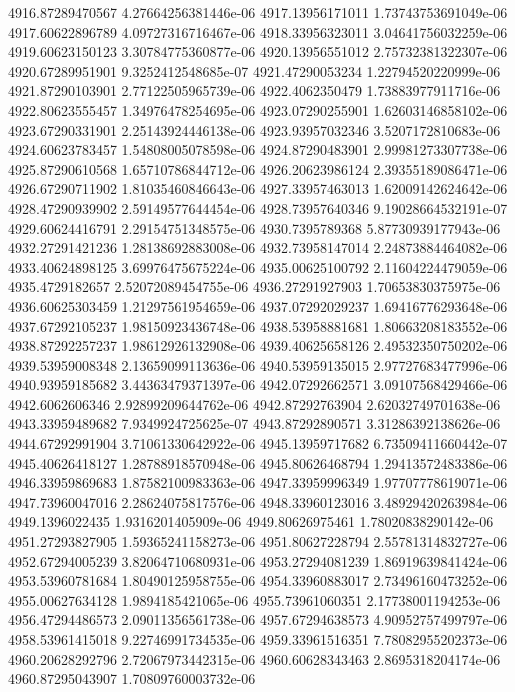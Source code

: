 {4916.87289470567 4.27664256381446e-06
4917.13956171011 1.73743753691049e-06
4917.60622896789 4.09727316716467e-06
4918.33956323011 3.04641756032259e-06
4919.60623150123 3.30784775360877e-06
4920.13956551012 2.75732381322307e-06
4920.67289951901 9.3252412548685e-07
4921.47290053234 1.22794520220999e-06
4921.87290103901 2.77122505965739e-06
4922.4062350479 1.73883977911716e-06
4922.80623555457 1.34976478254695e-06
4923.07290255901 1.62603146858102e-06
4923.67290331901 2.25143924446138e-06
4923.93957032346 3.5207172810683e-06
4924.60623783457 1.54808005078598e-06
4924.87290483901 2.99981273307738e-06
4925.87290610568 1.65710786844712e-06
4926.20623986124 2.39355189086471e-06
4926.67290711902 1.81035460846643e-06
4927.33957463013 1.62009142624642e-06
4928.47290939902 2.59149577644454e-06
4928.73957640346 9.19028664532191e-07
4929.60624416791 2.29154751348575e-06
4930.7395789368 5.87730939177943e-06
4932.27291421236 1.28138692883008e-06
4932.73958147014 2.24873884464082e-06
4933.40624898125 3.69976475675224e-06
4935.00625100792 2.11604224479059e-06
4935.4729182657 2.52072089454755e-06
4936.27291927903 1.70653830375975e-06
4936.60625303459 1.21297561954659e-06
4937.07292029237 1.69416776293648e-06
4937.67292105237 1.98150923436748e-06
4938.53958881681 1.80663208183552e-06
4938.87292257237 1.98612926132908e-06
4939.40625658126 2.49532350750202e-06
4939.53959008348 2.13659099113636e-06
4940.53959135015 2.97727683477996e-06
4940.93959185682 3.44363479371397e-06
4942.07292662571 3.09107568429466e-06
4942.6062606346 2.92899209644762e-06
4942.87292763904 2.62032749701638e-06
4943.33959489682 7.9349924725625e-07
4943.87292890571 3.31286392138626e-06
4944.67292991904 3.71061330642922e-06
4945.13959717682 6.73509411660442e-07
4945.40626418127 1.28788918570948e-06
4945.80626468794 1.29413572483386e-06
4946.33959869683 1.87582100983363e-06
4947.33959996349 1.97707778619071e-06
4947.73960047016 2.28624075817576e-06
4948.33960123016 3.48929420263984e-06
4949.1396022435 1.9316201405909e-06
4949.80626975461 1.78020838290142e-06
4951.27293827905 1.59365241158273e-06
4951.80627228794 2.55781314832727e-06
4952.67294005239 3.82064710680931e-06
4953.27294081239 1.86919639841424e-06
4953.53960781684 1.80490125958755e-06
4954.33960883017 2.73496160473252e-06
4955.00627634128 1.9894185421065e-06
4955.73961060351 2.17738001194253e-06
4956.47294486573 2.09011356561738e-06
4957.67294638573 4.90952757499797e-06
4958.53961415018 9.22746991734535e-06
4959.33961516351 7.78082955202373e-06
4960.20628292796 2.72067973442315e-06
4960.60628343463 2.8695318204174e-06
4960.87295043907 1.70809760003732e-06
}
